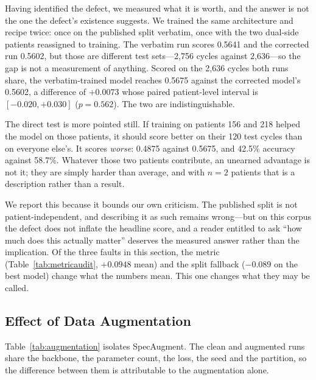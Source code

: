 \documentclass[journal,onecolumn]{IEEEtran}
\begin{document}
Having identified the defect, we measured what it is worth, and the answer is not the one
the defect's existence suggests. We trained the same architecture and recipe twice: once on
the published split verbatim, once with the two dual-side patients reassigned to training.
The verbatim run scores 0.5641 and the corrected run 0.5602, but those are different test
sets---2{,}756 cycles against 2{,}636---so the gap is not a measurement of anything. Scored
on the 2{,}636 cycles both runs share, the verbatim-trained model reaches 0.5675 against the
corrected model's 0.5602, a difference of $+0.0073$ whose paired patient-level interval is
$[-0.020, +0.030]$ ($p = 0.562$). The two are indistinguishable.

The direct test is more pointed still. If training on patients 156 and 218 helped the model
on those patients, it should score better on their 120 test cycles than on everyone else's.
It scores \emph{worse}: 0.4875 against 0.5675, and 42.5\% accuracy against 58.7\%. Whatever
those two patients contribute, an unearned advantage is not it; they are simply harder than
average, and with $n = 2$ patients that is a description rather than a result.

We report this because it bounds our own criticism. The published split is not
patient-independent, and describing it as such remains wrong---but on this corpus the defect
does not inflate the headline score, and a reader entitled to ask ``how much does this
actually matter'' deserves the measured answer rather than the implication. Of the three
faults in this section, the metric (Table~\ref{tab:metricaudit}, $+0.0948$ mean) and the
split fallback ($-0.089$ on the best model) change what the numbers mean. This one changes
what they may be called.

\subsection{Effect of Data Augmentation}
\label{subsec:augmentation}

Table~\ref{tab:augmentation} isolates SpecAugment. The clean and augmented runs share
the backbone, the parameter count, the loss, the seed and the partition, so the
difference between them is attributable to the augmentation alone.
\end{document}
